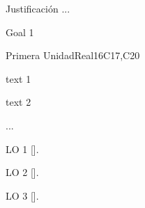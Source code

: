 \begin{syllabus}


\begin{justification}
Justificación ...
\end{justification}

\begin{goals}
\item Goal 1
\end{goals}

\begin{outcomes}
   \item {}
   \item {}
   \item {}
\end{outcomes}

\begin{competences}
    \item {}
    \item {}
    \item {}
\end{competences}

\begin{unit}{}{Primera Unidad}{Real}{16}{C17,C20}
\begin{topics}
      \item text 1
      \item text 2
      \item ...
\end{topics}

\begin{learningoutcomes}
   \item LO 1 [\Usage].
   \item LO 2 [\Usage].
   \item LO 3 [\Usage].
\end{learningoutcomes}
\end{unit}



\begin{coursebibliography}
\end{coursebibliography}

\end{syllabus}

